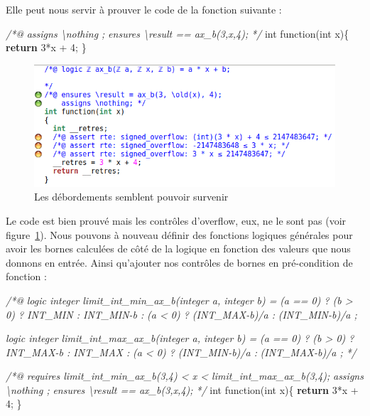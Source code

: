 \documentclass[12pt,francais,]{scrbook}
\newenvironment{Shaded}{}{}
\newcommand{\KeywordTok}[1]{\textcolor[rgb]{0.00,0.44,0.13}{\textbf{{#1}}}}
\newcommand{\DataTypeTok}[1]{\textcolor[rgb]{0.56,0.13,0.00}{{#1}}}
\newcommand{\DecValTok}[1]{\textcolor[rgb]{0.25,0.63,0.44}{{#1}}}
\newcommand{\CommentTok}[1]{\textcolor[rgb]{0.38,0.63,0.69}{\textit{{#1}}}}
\newcommand{\NormalTok}[1]{{#1}}
\begin{document}
Elle peut nous servir à prouver le code de la fonction suivante :

\begin{footnotesize}\begin{Shaded}
\begin{Highlighting}[]
\CommentTok{/*@ }
\CommentTok{  assigns \textbackslash{}nothing ;}
\CommentTok{  ensures \textbackslash{}result == ax_b(3,x,4); }
\CommentTok{*/}
\DataTypeTok{int} \NormalTok{function(}\DataTypeTok{int} \NormalTok{x)\{}
  \KeywordTok{return} \DecValTok{3}\NormalTok{*x + }\DecValTok{4}\NormalTok{;}
\NormalTok{\}}
\end{Highlighting}
\end{Shaded}\end{footnotesize}

\begin{figure}[htbp]
\centering
\includegraphics[scale=0.5]{4-3-affine-1.png}
\caption{Les débordements semblent pouvoir survenir}
\label{fig:4-3-affine-1}
\end{figure}

Le code est bien prouvé mais les contrôles d'overflow, eux, ne le sont
pas (voir figure~\ref{fig:4-3-affine-1}). Nous pouvons à nouveau définir
des fonctions logiques générales pour avoir les bornes calculées de côté
de la logique en fonction des valeurs que nous donnons en entrée. Ainsi
qu'ajouter nos contrôles de bornes en pré-condition de fonction :

\begin{footnotesize}\begin{Shaded}
\begin{Highlighting}[]
\CommentTok{/*@}
\CommentTok{  logic integer limit_int_min_ax_b(integer a, integer b) =}
\CommentTok{    (a == 0) ? (b > 0) ? INT_MIN : INT_MIN-b :}
\CommentTok{    (a <  0) ? (INT_MAX-b)/a :}
\CommentTok{               (INT_MIN-b)/a ;}

\CommentTok{  logic integer limit_int_max_ax_b(integer a, integer b) =}
\CommentTok{    (a == 0) ? (b > 0) ? INT_MAX-b : INT_MAX :}
\CommentTok{    (a <  0) ? (INT_MIN-b)/a :}
\CommentTok{               (INT_MAX-b)/a ;}
\CommentTok{*/}

\CommentTok{/*@}
\CommentTok{  requires limit_int_min_ax_b(3,4) < x < limit_int_max_ax_b(3,4);}
\CommentTok{  assigns \textbackslash{}nothing ;}
\CommentTok{  ensures \textbackslash{}result == ax_b(3,x,4);}
\CommentTok{*/}
\DataTypeTok{int} \NormalTok{function(}\DataTypeTok{int} \NormalTok{x)\{}
  \KeywordTok{return} \DecValTok{3}\NormalTok{*x + }\DecValTok{4}\NormalTok{;}
\NormalTok{\}}
\end{Highlighting}
\end{Shaded}\end{footnotesize}
\end{document}
